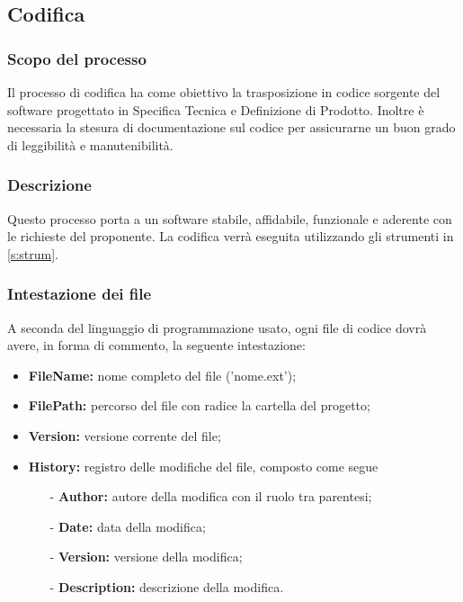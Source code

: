 \documentclass[a4paper,11pt]{article}
\begin{document}
			
		\subsection{Codifica}
			\subsubsection{Scopo del processo}
			Il processo di codifica ha come obiettivo la trasposizione in codice sorgente del software progettato in Specifica Tecnica e Definizione di Prodotto. Inoltre è necessaria la stesura di documentazione sul codice per assicurarne un buon grado di leggibilità e manutenibilità.
			\subsubsection{Descrizione}		
				Questo processo porta a un software stabile, affidabile, funzionale e aderente con le richieste del proponente. La codifica verrà eseguita utilizzando gli strumenti in \ref{s:strum}.
			
			\subsubsection{Intestazione dei file}		
			A seconda del linguaggio di programmazione usato, ogni file di codice dovrà avere, in forma di commento, la seguente intestazione:		
			
		\begin{itemize}
		\item \textbf{FileName:} nome completo del file ('nome.ext');
		\item \textbf{FilePath:} percorso del file con radice la cartella del progetto;
		\item \textbf{Version:} versione corrente del file;
		\item \textbf{History:} registro delle modifiche del file, composto come segue 
			\begin{itemize}
			\item[-] \textbf{Author:} autore della modifica con il ruolo tra parentesi;
			\item[-] \textbf{Date:} data della modifica;
			\item[-] \textbf{Version:} versione della modifica;
			\item[-] \textbf{Description:} descrizione della modifica.
			\end{itemize}	
		\end{itemize}
		
\end{document}
